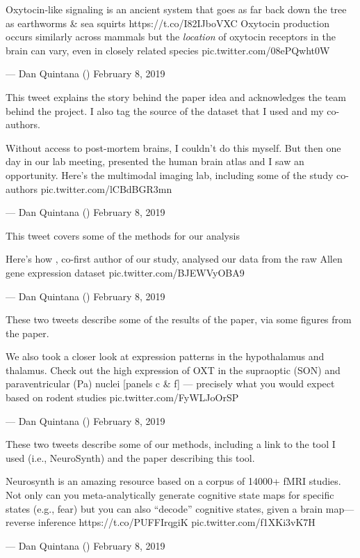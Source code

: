 \documentclass[]{book}
\begin{document}
Oxytocin-like signaling is an ancient system that goes as far back down the tree as earthworms \& sea squirts https://t.co/I82IJboVXC Oxytocin production occurs similarly across mammals but the \emph{location} of oxytocin receptors in the brain can vary, even in closely related species pic.twitter.com/08ePQwht0W

--- Dan Quintana (\citet{dsquintana}) February 8, 2019

This tweet explains the story behind the paper idea and acknowledges the team behind the project. I also tag the source of the dataset that I used and my co-authors.

Without access to post-mortem brains, I couldn't do this myself. But then one day in our lab meeting, \citet{jarekrokicki} presented the \citet{AllenInstitute} human brain atlas and I saw an opportunity. Here's the \citet{SFFNORMENT} multimodal imaging lab, including some of the study co-authors pic.twitter.com/lCBdBGR3mn

--- Dan Quintana (\citet{dsquintana}) February 8, 2019

This tweet covers some of the methods for our analysis

Here's how \citet{jarekrokicki}, co-first author of our study, analysed our data from the raw Allen gene expression dataset pic.twitter.com/BJEWVyOBA9

--- Dan Quintana (\citet{dsquintana}) February 8, 2019

These two tweets describe some of the results of the paper, via some figures from the paper.

We also took a closer look at expression patterns in the hypothalamus and thalamus. Check out the high expression of OXT in the supraoptic (SON) and paraventricular (Pa) nuclei {[}panels c \& f{]} --- precisely what you would expect based on rodent studies pic.twitter.com/FyWLJoOrSP

--- Dan Quintana (\citet{dsquintana}) February 8, 2019

These two tweets describe some of our methods, including a link to the tool I used (i.e., NeuroSynth) and the paper describing this tool.

Neurosynth is an amazing resource based on a corpus of 14000+ fMRI studies. Not only can you meta-analytically generate cognitive state maps for specific states (e.g., fear) but you can also ``decode'' cognitive states, given a brain map---reverse inference https://t.co/PUFFIrqgiK pic.twitter.com/f1XKi3vK7H

--- Dan Quintana (\citet{dsquintana}) February 8, 2019
\end{document}
